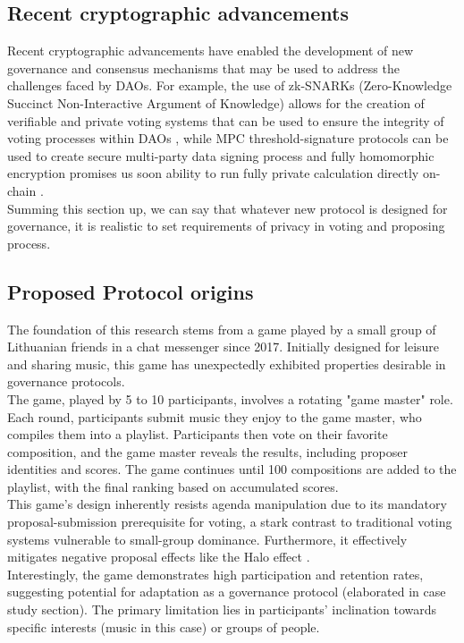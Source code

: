 \documentclass{article}
\begin{document}
\begin{CJK}{UTF8}{gbsn}
\begin{multicols}{2}
        \subsection{Recent cryptographic advancements}
        Recent cryptographic advancements have enabled the development of new governance and consensus mechanisms that may be used to address the challenges faced by DAOs. For example, the use of zk-SNARKs (Zero-Knowledge Succinct Non-Interactive Argument of Knowledge) allows for the creation of verifiable and private voting systems that can be used to ensure the integrity of voting processes within DAOs \cite{Ben-Sasson2014}, while MPC threshold-signature protocols can be used to create secure multi-party data signing process \cite{Doerner2023} and fully homomorphic encryption promises us soon ability to run fully private calculation directly on-chain \cite{Fhenix}.\\
        Summing this section up, we can say that whatever new protocol is designed for governance, it is realistic to set requirements of privacy in voting and proposing process.

        \subsection{Proposed Protocol origins}\label{sec:protocol_origins}
        The foundation of this research stems from a game played by a small group of Lithuanian friends in a chat messenger since 2017. Initially designed for leisure and sharing music, this game has unexpectedly exhibited properties desirable in governance protocols.\\
        The game, played by 5 to 10 participants, involves a rotating "game master" role. Each round, participants submit music they enjoy to the game master, who compiles them into a playlist. Participants then vote on their favorite composition, and the game master reveals the results, including proposer identities and scores. The game continues until 100 compositions are added to the playlist, with the final ranking based on accumulated scores\cite{DariusYoutube}.\\
        This game's design inherently resists agenda manipulation due to its mandatory proposal-submission prerequisite for voting, a stark contrast to traditional voting systems vulnerable to small-group dominance\cite{McKelvey1976}. Furthermore, it effectively mitigates negative proposal effects like the Halo effect \cite{Verhulst2010}. \\
        Interestingly, the game demonstrates high participation and retention rates, suggesting potential for adaptation as a governance protocol (elaborated in case study section). The primary limitation lies in participants' inclination towards specific interests (music in this case) or groups of people.


\end{multicols}
\end{CJK}
\end{document}
